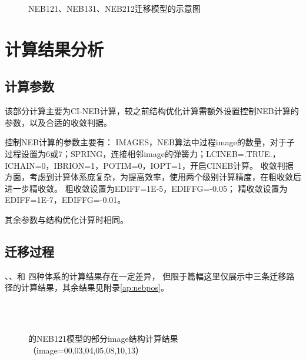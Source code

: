 \begin{figure}[htbp]
    \centering
    \caption{NEB121、NEB131、NEB212迁移模型的示意图}
    \label{fig:111-neb-Li-path}
\end{figure}


\section{计算结果分析}

\subsection{计算参数}

该部分计算主要为CI-NEB计算，较之前结构优化计算需额外设置控制NEB计算的参数，以及合适的收敛判据。

控制NEB计算的参数主要有：
IMAGES，NEB算法中过程image的数量，对于子过程设置为6或7；SPRING，连接相邻image的弹簧力；LCINEB=.TRUE.，ICHAIN=0，IBRION=1，POTIM=0，IOPT=1，开启CINEB计算。
收敛判据方面，考虑到计算体系庞复杂，为提高效率，使用两个级别计算精度，在粗收敛后进一步精收敛。
粗收敛设置为EDIFF=1E-5，EDIFFG=-0.05；
精收敛设置为EDIFF=1E-7，EDIFFG=-0.01。

其余参数与结构优化计算时相同。

\subsection{迁移过程}

、、和 四种体系的计算结果存在一定差异，
但限于篇幅这里仅展示中三条迁移路径的计算结果，其余结果见附录\ref{ap:nebpos}。

\begin{figure}[htbp]
    \centering
     \\
     \\ 
    \caption{的NEB121模型的部分image结构计算结果（image=00,03,04,05,08,10,13）}
    \label{fig:111-neb121-contcar}
\end{figure}

